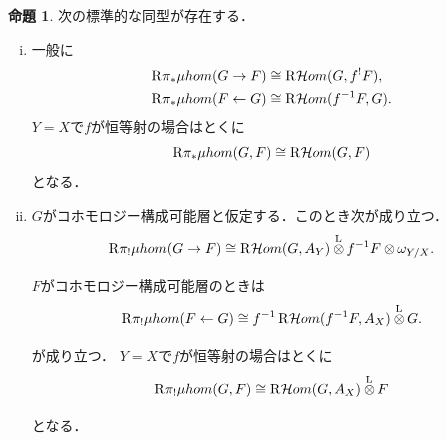\documentclass[leqno, 10pt, a4paper, dvipdfmx]{jsarticle}
\theoremstyle{definition}
\numberwithin{equation}{section}
\newcommand{\HOM}{\mathop{\mathcal{H}\hspace{-0pt}om}\nolimits}%
\newcommand{\RHOM}{\mathop{\mathrm{R}\hspace{-1.5pt}\HOM}\nolimits}
\newcommand{\Rder}{\mathrm{R}}
\newcommand{\tens}[1][]{\mathbin{\otimes_{\raise1.5ex\hbox to-.1em{}{#1}}}}
\newcommand{\lltens}[1][]{\mathbin{{\mathop{\tens}\limits^{\mathrm{L}}_{#1}}}}
\theoremstyle{mystyle}
\newtheorem{PRP}[AXM]{命題}
\renewenvironment{leftbar}{%
  \def\FrameCommand{\textcolor{lightgray}{\vrule width 4pt} \hspace{10pt}}%
  \MakeFramed {\advance\hsize-\width \FrameRestore}}%
{\endMakeFramed}
\newcommand{\muhom}{\mu hom}
\begin{document}
\begin{leftbar}
\begin{PRP}\label{prp4.4.2}
  次の標準的な同型が存在する．
  \begin{enumerate}[(i)]
    \item 一般に
    \begin{align*}
      \Rder{\pi_{\ast}}\muhom(G\to F)&\cong\RHOM(G,f^{!}F),\\
      \Rder{\pi_{\ast}}\muhom(F\leftarrow G)&\cong\RHOM(f^{-1}F,G).
    \end{align*}
    \(Y=X\)で\(f\)が恒等射の場合はとくに\[
      \Rder{\pi_{\ast}}\muhom(G, F)\cong\RHOM(G,F)
    \]
    となる．
    \item \(G\)がコホモロジー構成可能層と仮定する．このとき次が成り立つ．\[
      \Rder{\pi_{!}}\muhom(G\to F)
      \cong
      \RHOM(G,A_Y)\lltens[]f^{-1}F\tens[]\omega_{Y/X}.
    \]
    \(F\)がコホモロジー構成可能層のときは
    \[
      \Rder{\pi_{!}}\muhom(F\leftarrow G)
      \cong
      f^{-1}\RHOM(f^{-1}F,A_X)\lltens[]G.
    \]が成り立つ．
    \(Y=X\)で\(f\)が恒等射の場合はとくに\[
      \Rder{\pi_{!}}\muhom(G, F)\cong\RHOM(G,A_X)\lltens[]F
    \]
    となる．
  \end{enumerate}
\end{PRP}
\end{leftbar}
\end{document}
